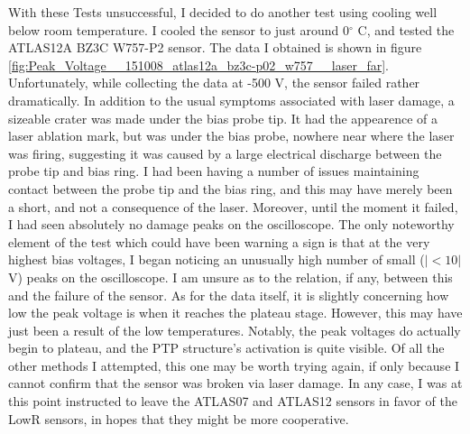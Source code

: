 \documentclass{report}
\begin{document}
            With these Tests unsuccessful, I decided to do another test using cooling well below room temperature. I cooled the sensor to just around 0$^\circ$ C, and tested the ATLAS12A BZ3C W757-P2 sensor. The data I obtained is shown in figure \ref{fig:Peak_Voltage__151008_atlas12a_bz3c-p02_w757__laser_far}. Unfortunately, while collecting the data at -500 V, the sensor failed rather dramatically. In addition to the usual symptoms associated with laser damage, a sizeable crater was made under the bias probe tip. It had the appearence of a laser ablation mark, but was under the bias probe, nowhere near where the laser was firing, suggesting it was caused by a large electrical discharge between the probe tip and bias ring. I had been having a number of issues maintaining contact between the probe tip and the bias ring, and this may have merely been a short, and not a consequence of the laser. Moreover, until the moment it failed, I had seen absolutely no damage peaks on the oscilloscope. The only noteworthy element of the test which could have been warning a sign is that at the very highest bias voltages, I began noticing an unusually high number of small ($|< 10|$ V) peaks on the oscilloscope. I am unsure as to the relation, if any, between this and the failure of the sensor. As for the data itself, it is slightly concerning how low the peak voltage is when it reaches the plateau stage. However, this may have just been a result of the low temperatures. Notably, the peak voltages do actually begin to plateau, and the PTP structure's activation is quite visible. Of all the other methods I attempted, this one may be worth trying again, if only because I cannot confirm that the sensor was broken via laser damage. In any case, I was at this point instructed to leave the ATLAS07 and ATLAS12 sensors in favor of the LowR sensors, in hopes that they might be more cooperative.


            
\end{document}
